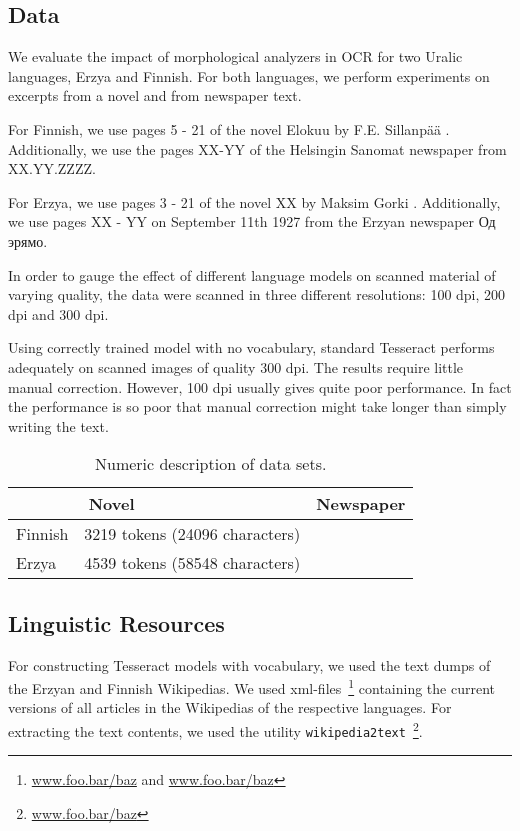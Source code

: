 \documentclass[b5paper]{article}
\begin{document}
\subsection{Data}
We evaluate the impact of morphological analyzers in OCR for two
Uralic languages, Erzya and Finnish. For both languages, we perform
experiments on excerpts from a novel and from newspaper text.
 
For Finnish, we use pages 5 - 21 of the novel Elokuu by
F.E. Sillanp\"{a}\"{a} \cite{sillanpaa08}. Additionally, we use the
pages XX-YY of the Helsingin Sanomat newspaper from XX.YY.ZZZZ.

For Erzya, we use pages 3 - 21 of the novel XX by Maksim Gorki
\cite{gorki}. Additionally, we use pages XX - YY on September 11th 1927
from the Erzyan newspaper Од эрямо.

In order to gauge the effect of different language models on scanned
material of varying quality, the data were scanned in three different
resolutions: 100 dpi, 200 dpi and 300 dpi.

Using correctly trained model with no vocabulary, standard Tesseract
performs adequately on scanned images of quality 300 dpi. The results
require little manual correction. However, 100 dpi usually gives quite
poor performance. In fact the performance is so poor that manual
correction might take longer than simply writing the text.

\begin{table}[!htb]
\begin{center}
\begin{tabular}{lrr}
\hline 
        & Novel~~~~~~~~~~~~~~~~~~   & Newspaper \\
\hline 
Finnish & 3219 tokens (24096 characters)  &          \\
Erzya   & 4539 tokens (58548 characters)  &          \\
\hline 
\end{tabular}
\caption{Numeric description of data sets.}\label{data-table}
\end{center}
\end{table}

\subsection{Linguistic Resources}
For constructing Tesseract models with vocabulary, we used the text
dumps of the Erzyan and Finnish Wikipedias. We used
xml-files~\footnote{\url{www.foo.bar/baz} and \url{www.foo.bar/baz}}
containing the current versions of all articles in the Wikipedias of
the respective languages. For extracting the text contents, we used
the utility {\tt wikipedia2text}~\footnote{\url{www.foo.bar/baz}}.
\end{document}
